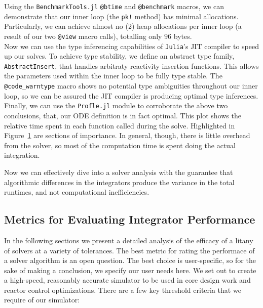 \documentclass[review,onefignum,onetabnum]{siamart171218}
\begin{document}
Using the \texttt{BenchmarkTools.jl} \texttt{@btime} and \texttt{@benchmark} macros,
we can demonstrate that our inner loop (the \texttt{pk!} method) has minimal allocations.
Particularly, we can achieve almost no (2) heap allocations per inner loop (a result of
our two \texttt{@view} macro calls), totalling only $96$ bytes. \\

Now we can use the type inferencing capabilities of \texttt{Julia}'s JIT compiler
to speed up our solves. To achieve type stability, we define an abstract type family,
\texttt{AbstractInsert}, that handles arbitraty reactivity insertion functions.
This allows the parameters used within the inner loop to be fully type stable.
The \texttt{@code\_warntype} macro shows no potential type
ambiguities throughout our inner loop, so we can be assured the JIT compiler is
producing optimal type inferences. \\

Finally, we can use the \texttt{Profle.jl} module to corroborate the above two
conclusions, that, our ODE definition is in fact optimal. This
plot shows the relative time spent in each function called during the solve. Highlighted
in Figure~\cref{fig:flame-plot} are sections of importance. In general, though,
there is little overhead from the solver, so most of the computation time is spent
doing the actual integration.\\

\begin{figure}[htb]
  \caption{}
  \label{fig:flame-plot}
\end{figure}

Now we can effectively dive into a solver analysis with the guarantee that algorithmic
differences in the integrators produce the variance in the total runtimes, and not
computational inefficiencies.

\subsection{Metrics for Evaluating Integrator Performance}
In the following sections we present a detailed analysis of the efficacy of a litany of solvers
at a variety of tolerances. The best metric for rating the performace of a solver algorithm
is an open question. The best choice is user-specific, so for the sake of making a
conclusion, we specify our user needs here. We set out to create a high-speed,
reasonably accurate simulator to be used in core design work and reactor control
optimizations. There are a few key threshold criteria that we require of our simulator:\\
\end{document}
